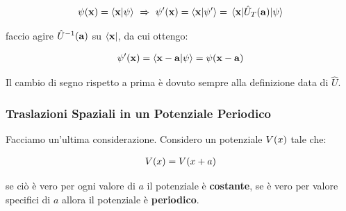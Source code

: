 \begin{align*}
	\psi(\vb{x}) = \braket{\vb{x}}{\psi} \, \, \Rightarrow \, \, \psi'(\vb{x}) = \braket{\vb{x}}{\psi'} = \mel{\vb{x}}{\hat{U}_T(\vb{a})}{\psi}
\end{align*}
	
	faccio agire $\hat{U}^{-1}(\vb{a})$ su $\bra{\vb{x}}$, da cui ottengo:
	
\begin{align*}
	\psi'(\vb{x}) = \braket{\vb{x} - \vb{a} }{\psi} = \psi\qty(\vb{x} - \vb{a})
\end{align*}

	Il cambio di segno rispetto a prima è dovuto sempre alla definizione data di $\hat{U}$.

\subsubsection{Traslazioni Spaziali in un Potenziale Periodico}

	Facciamo un'ultima considerazione. Considero un potenziale $V\qty(x)$ tale che:
	
\begin{align*}
	V\qty(x) = V\qty(x + a)
\end{align*}

	se ciò è vero per ogni valore di $a$ il potenziale è \textbf{costante}, se è vero per valore specifici di $a$ allora il potenziale è \textbf{periodico}.

\vspace{1em}
\begin{center}
\end{center}
\vspace{1em}

